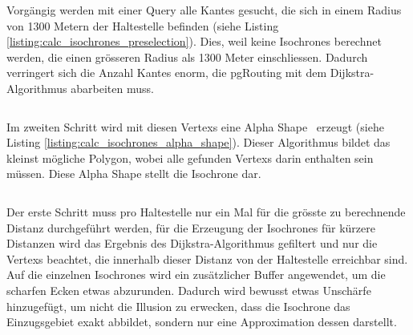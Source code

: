 \begin{listing}[ht]
    \inputminted{sql}{projectdoc/listing/calc_isochrones_dijkstra.sql}
    \caption[Dijkstra-Algorithmus zur Berechnung von Isochronen]{Mit einem \gls{Dijkstra-Algorithmus} werden bis zur Maximaldistanz alle erreichbaren \glspl{Vertex} gesucht (Auszug)}
    \label{listing:calc_isochrones_dijkstra}
\end{listing}

Vorgängig werden mit einer Query alle \glspl{Kante} gesucht, die sich in einem Radius von 1300 Metern der \gls{Haltestelle} befinden (siehe Listing \ref{listing:calc_isochrones_preselection}).
Dies, weil keine \glspl{Isochrone} berechnet werden, die einen grösseren Radius als 1300 Meter einschliessen.
Dadurch verringert sich die Anzahl \glspl{Kante} enorm, die pgRouting mit dem \gls{Dijkstra-Algorithmus} abarbeiten muss.

\begin{listing}[ht]
    \inputminted{sql}{projectdoc/listing/calc_isochrones_preselection.sql}
    \caption[Vorselektion der Kanten für die Berechnung von Isochronen]{Mit einer effizienten Index-Suche werden alle \glspl{Kante} in der Nähe der \gls{Haltestelle} ermittelt (Auszug)}
    \label{listing:calc_isochrones_preselection}
\end{listing}

Im zweiten Schritt wird mit diesen \glspl{Vertex} eine Alpha Shape~\cite{alpha_shapes} erzeugt (siehe Listing \ref{listing:calc_isochrones_alpha_shape}). Dieser Algorithmus bildet das kleinst mögliche Polygon, wobei alle gefunden \glspl{Vertex} darin enthalten sein müssen.
Diese Alpha Shape stellt die \gls{Isochrone} dar.

\begin{listing}[ht]
    \inputminted{sql}{projectdoc/listing/calc_isochrones_alpha_shape.sql}
    \caption[Berechnung der Alpha Shape]{Mit den erreichbaren \glspl{Vertex} wird eine Alpha Shape erzeugt (Auszug)}
    \label{listing:calc_isochrones_alpha_shape}
\end{listing}

Der erste Schritt muss pro \gls{Haltestelle} nur ein Mal für die grösste zu berechnende Distanz durchgeführt werden, für die Erzeugung der \glspl{Isochrone} für kürzere Distanzen wird das Ergebnis des \gls{Dijkstra-Algorithmus} gefiltert und nur die \glspl{Vertex} beachtet, die innerhalb dieser Distanz von der \gls{Haltestelle} erreichbar sind.
Auf die einzelnen \glspl{Isochrone} wird ein zusätzlicher Buffer angewendet, um die scharfen Ecken etwas abzurunden.
Dadurch wird bewusst etwas Unschärfe hinzugefügt, um nicht die Illusion zu erwecken, dass die \gls{Isochrone} das Einzugsgebiet exakt abbildet, sondern nur eine Approximation dessen darstellt.


